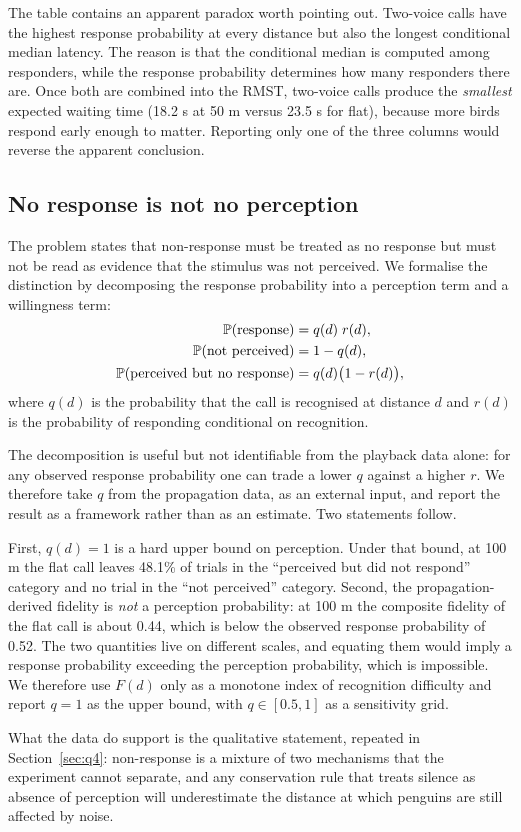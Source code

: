 The table contains an apparent paradox worth pointing out. Two-voice calls have the highest
response probability at every distance but also the longest conditional median latency. The
reason is that the conditional median is computed among responders, while the response
probability determines how many responders there are. Once both are combined into the RMST,
two-voice calls produce the \emph{smallest} expected waiting time (18.2 s at 50 m versus 23.5 s
for flat), because more birds respond early enough to matter. Reporting only one of the three
columns would reverse the apparent conclusion.

\subsection{No response is not no perception}\label{sec:q3-perception}

The problem states that non-response must be treated as no response but must not be read as
evidence that the stimulus was not perceived. We formalise the distinction by decomposing the
response probability into a perception term and a willingness term:
\begin{align}
  \mathbb{P}(\text{response}) &= q(d)\; r(d) ,\label{eq:decomp}\\
  \mathbb{P}(\text{not perceived}) &= 1-q(d),\\
  \mathbb{P}(\text{perceived but no response}) &= q(d)\bigl(1-r(d)\bigr),
\end{align}
where $q(d)$ is the probability that the call is recognised at distance $d$ and $r(d)$ is the
probability of responding conditional on recognition.

The decomposition is useful but not identifiable from the playback data alone: for any observed
response probability one can trade a lower $q$ against a higher $r$. We therefore take $q$ from
the propagation data, as an external input, and report the result as a framework rather than as
an estimate. Two statements follow.

First, $q(d)=1$ is a hard upper bound on perception. Under that bound, at 100 m the flat call
leaves 48.1\% of trials in the ``perceived but did not respond'' category and no trial in the
``not perceived'' category. Second, the propagation-derived fidelity is \emph{not} a perception
probability: at 100 m the composite fidelity of the flat call is about 0.44, which is below the
observed response probability of 0.52. The two quantities live on different scales, and equating
them would imply a response probability exceeding the perception probability, which is
impossible. We therefore use $F(d)$ only as a monotone index of recognition difficulty and
report $q=1$ as the upper bound, with $q\in[0.5,1]$ as a sensitivity grid.

What the data do support is the qualitative statement, repeated in
Section~\ref{sec:q4}: non-response is a mixture of two mechanisms that the experiment cannot
separate, and any conservation rule that treats silence as absence of perception will
underestimate the distance at which penguins are still affected by noise.
